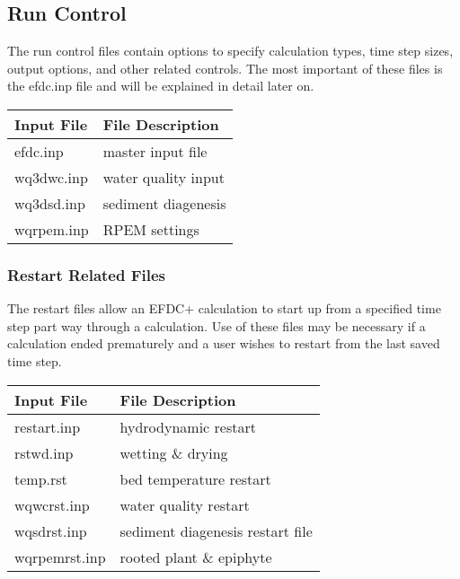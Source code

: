 \documentclass[letterpaper,10pt,english]{sphinxmanual}
\begin{document}
\noindent{}


\subsection{Run Control}
\label{\detokenize{inputfiles/runcontrol/index:run-control}}\label{\detokenize{inputfiles/runcontrol/index:runcontrol}}\label{\detokenize{inputfiles/runcontrol/index::doc}}
The run control files contain options to specify calculation types, time step sizes, output options, and other related controls.  The most important of these files is the efdc.inp file and will be explained in detail later on.


\begin{savenotes}\sphinxattablestart
\centering
\begin{tabulary}{\linewidth}[t]{|T|T|}
\hline
\sphinxstyletheadfamily 
Input File
&\sphinxstyletheadfamily 
File Description
\\
\hline
efdc.inp
&
master input file
\\
\hline
wq3dwc.inp
&
water quality input
\\
\hline
wq3dsd.inp
&
sediment diagenesis
\\
\hline
wqrpem.inp
&
RPEM settings
\\
\hline
\end{tabulary}
\par
\sphinxattableend\end{savenotes}


\subsubsection{Restart  Related Files}
\label{\detokenize{inputfiles/runcontrol/index:restart-related-files}}
The restart files allow an EFDC+ calculation to start up from a specified time step part way through a calculation.  Use of these files may be necessary if a calculation ended prematurely and a user wishes to restart from the last saved time step.


\begin{savenotes}\sphinxattablestart
\centering
\begin{tabulary}{\linewidth}[t]{|T|T|}
\hline
\sphinxstyletheadfamily 
Input File
&\sphinxstyletheadfamily 
File Description
\\
\hline
restart.inp
&
hydrodynamic restart
\\
\hline
rstwd.inp
&
wetting  \& drying
\\
\hline
temp.rst
&
bed temperature restart
\\
\hline
wqwcrst.inp
&
water quality restart
\\
\hline
wqsdrst.inp
&
sediment diagenesis restart file
\\
\hline
wqrpemrst.inp
&
rooted plant \& epiphyte
\\
\hline
\end{tabulary}
\par
\sphinxattableend\end{savenotes}
\end{document}
